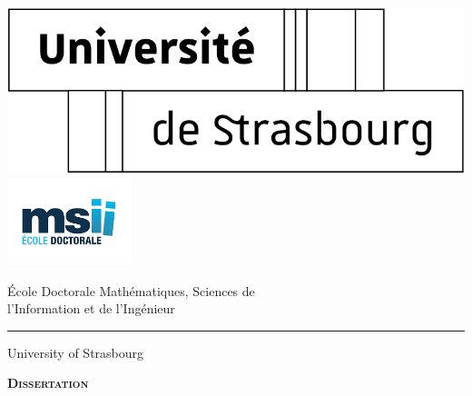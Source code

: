 \newcommand{\thetitle}{New radiomics approaches \\ \vspace{-0.2pt}
for hepatic tumor characterization \\ \vspace{-8pt} by imaging analysis}
%
\begin{titlingpage} 
	\renewcommand{\baselinestretch}{0}
	\renewcommand{\arraystretch}{0.75}
	
	\hspace{-.7cm}
	\includegraphics[width=.23\linewidth]{Logo/logo_unistra}\hfill
	\includegraphics[width=0.27\textwidth]{Logo/logo_msii}
	\begin{minipage}{\linewidth}
	\end{minipage}
	
	\begin{center}
		{\LARGE \'{E}cole Doctorale Math\'{e}matiques, Sciences de \\l'Information et de l'Ing\'{e}nieur}
		\vspace{.5mm}
		\hrule
		\vspace{2.5mm}
		{\LARGE  University of Strasbourg}
		
		\vspace{1\baselineskip}
		
		{\LARGE \textbf  \textsc{Dissertation}}
		

\end{center}
\end{titlingpage}
